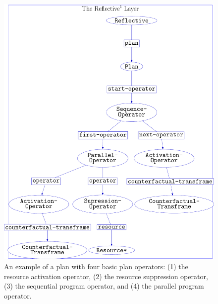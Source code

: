 \begin{figure}
\centering
\includegraphics[width=12cm]{gfx/example_plan_operators}
\caption[An example of a plan with four composable plan operators.]{An
  example of a plan with four basic plan operators: (1) the resource
  activation operator, (2) the resource suppression operator, (3) the
  sequential program operator, and (4) the parallel program operator.}
\label{figure:example_plan_operators}
\end{figure}
